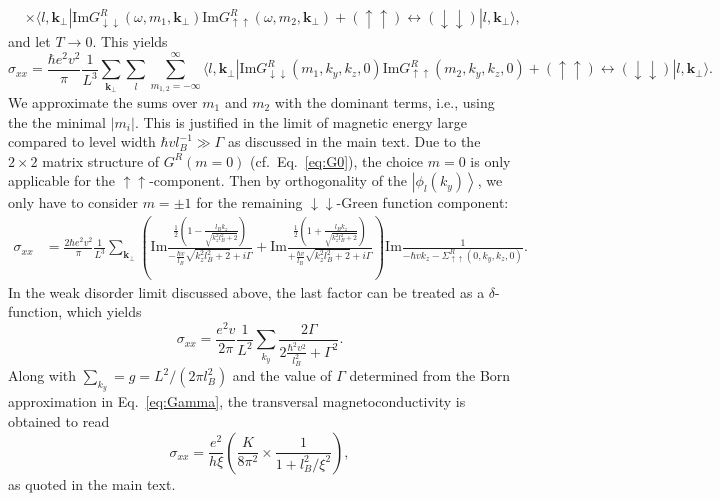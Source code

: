 \documentclass[aps,prb,10pt,amsmath,amssymb,twocolumn,floatfix,superscriptaddress,showpacs,numerical,footinbib]{revtex4-1}
\newcommand{\ket}[1]{| #1 \rangle}
\newcommand{\bra}[1]{\langle #1 |}
\begin{document}
\begin{widetext}
\begin{align}
 & \times \bra{l,\mathbf{k}_\perp} \mathrm{Im}G_{\downarrow\downarrow}^{R} \left( \omega, m_{1},\mathbf{k}_\perp \right)\mathrm{Im} G_{\uparrow\uparrow}^{R}\left(\omega, m_{2}, \mathbf{k}_\perp \right)+(\uparrow\uparrow)\leftrightarrow(\downarrow\downarrow) \ket{l,\mathbf{k}_\perp},
\end{align}
%
and let $T\to 0$.
%
This yields
%
\begin{equation}
\sigma_{xx}  = \frac{\hbar e^{2}v^{2}}{\pi} \frac{1}{L^3} \sum_{\mathbf{k}_\perp}\sum_{l}\sum_{m_{1,2}=-\infty}^{\infty} \bra{l,\mathbf{k}_\perp} \mathrm{Im}G_{\downarrow\downarrow}^{R}\left(m_{1},k_{y},k_{z},0\right)\mathrm{Im}G_{\uparrow\uparrow}^{R}\left(m_{2},k_{y},k_{z},0\right)+(\uparrow\uparrow)\leftrightarrow(\downarrow\downarrow) \ket{l,\mathbf{k}_\perp}.
\end{equation}
%
We approximate the sums over $m_{1}$ and $m_{2}$ with the dominant terms, i.e., using the the minimal $|m_{i}|$.
%
This is justified in the limit of magnetic energy large compared to level width $\hbar v l_B^{-1}\gg\Gamma$ as discussed in the main text.
%
Due to the $2\times2$ matrix structure of $G^{R}(m=0)$ (cf.\ Eq.~\eqref{eq:G0}), the choice $m=0$ is only applicable for the $\uparrow\uparrow$-component.
%
Then by orthogonality of the $\left|\phi_{l}(k_{y})\right\rangle $, we only have to consider $m=\pm1$ for the remaining $\downarrow\downarrow$-Green function component:
\begin{align}
\sigma_{xx} & = \frac{2\hbar e^{2}v^{2}}{\pi} \frac{1}{L^3}\sum_{\mathbf{k}_\perp} \left( \mathrm{Im}\frac{\frac{1}{2}\left(1-\frac{l_{B}k_{z}}{\sqrt{k_{z}^{2}l_{B}^{2}+2}}\right)}{-\frac{\hbar v}{l_{B}}\sqrt{k_{z}^{2}l_{B}^{2}+2}+i\Gamma}+\mathrm{Im}\frac{\frac{1}{2}\left(1+\frac{l_{B}k_{z}}{\sqrt{k_{z}^{2}l_{B}^{2}+2}}\right)}{+\frac{\hbar v}{l_{B}}\sqrt{k_{z}^{2}l_{B}^{2}+2}+i\Gamma}\right) \mathrm{Im}\frac{1}{-\hbar vk_{z}-\Sigma_{\uparrow\uparrow}^{R}\left(0,k_{y},k_{z},0\right)}.
\end{align}
In the weak disorder limit discussed above, the last factor can be
treated as a $\delta$-function, which yields
\begin{equation}
\sigma_{xx} = \frac{e^{2}v}{2\pi}\frac{1}{L^{2}}\sum_{k_{y}}\frac{2\Gamma}{2\frac{\hbar^{2}v^{2}}{l_{B}^{2}}+\Gamma^{2}}.
\end{equation}
Along with $\sum_{k_{y}}=g=L^{2}/(2\pi l_{B}^{2})$ and the
value of $\Gamma$ determined from the Born approximation in Eq.~\eqref{eq:Gamma}, the transversal magnetoconductivity is obtained to read
\begin{equation}
\sigma_{xx}=\frac{e^{2}}{h\xi}\left( \frac{K}{8\pi^{2}}\times\frac{1}{1+l_{B}^{2}/\xi^{2}}\right) ,
\end{equation}
as quoted in the main text.
\end{widetext}


\end{document}
